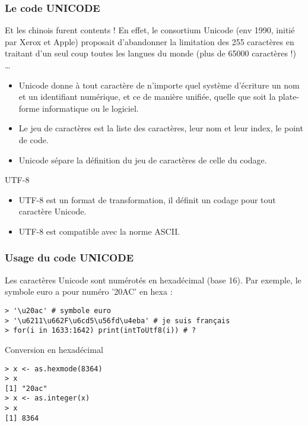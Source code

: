 \documentclass[10pt]{beamer}
\begin{document}
\begin{frame}
  \frametitle{Le code UNICODE}
Et les chinois furent contents ! En effet, le consortium \alert{Unicode} (env 1990, initié par Xerox et Apple) proposait d'abandonner la limitation des 255 caractères en traitant d'un seul coup toutes les
langues du monde (plus de 65000 caractères !) \dots
    \begin{itemize}
    \item \alert{Unicode} donne à tout caractère de n’importe quel système d'écriture un nom et un identifiant numérique, et ce de manière unifiée, quelle que soit la plate-forme informatique ou le logiciel.
    \item Le jeu de caractères est la liste des caractères, leur nom et leur index, le point de code.
    \item<alert@1> Unicode sépare la définition du jeu de caractères de celle du codage.
    \end{itemize}

  \begin{block}{UTF-8}
    \begin{itemize}
    \item \alert{UTF-8 est un format de transformation}, il définit un codage pour tout caractère Unicode.
    \item<alert@1> UTF-8 est compatible avec la norme ASCII.
    \end{itemize}
  \end{block}

\end{frame}


\begin{frame}[fragile]
  \frametitle{Usage du code UNICODE}
  Les caractères Unicode sont numérotés en hexadécimal (base 16).
  Par exemple, le symbole euro a pour numéro '20AC' en hexa :
  \begin{lstlisting}
> '\u20ac' # symbole euro
> '\u6211\u662F\u6cd5\u56fd\u4eba' # je suis français
> for(i in 1633:1642) print(intToUtf8(i)) # ?
\end{lstlisting}

\begin{exampleblock}{Conversion en hexadécimal}
\begin{lstlisting}[style=block]
> x <- as.hexmode(8364)
> x
[1] "20ac"
> x <- as.integer(x)
> x
[1] 8364
\end{lstlisting}
\end{exampleblock}
\end{frame}
\end{document}
